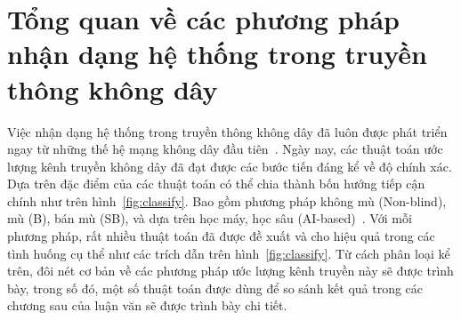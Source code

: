 \clearpage
{}

\setcounter{chapter}{0}
\chapter[TỔNG QUAN VỀ CÁC PHƯƠNG PHÁP NHẬN DẠNG HỆ THỐNG TRONG TRUYỀN THÔNG KHÔNG DÂY]{Tổng quan về các phương pháp nhận dạng hệ thống trong truyền thông không dây}
\label{sec:back}

Việc nhận dạng hệ thống trong truyền thông không dây đã luôn được phát triển ngay từ những thế hệ mạng không dây đầu tiên~\cite{Tse2005}. Ngày nay, các thuật toán ước lượng kênh truyền không dây đã đạt được các bước tiến đáng kể về độ chính xác. Dựa trên đặc điểm của các thuật toán có thể chia thành bốn hướng tiếp cận chính như trên hình~\ref{fig:classify}. Bao gồm phương pháp không mù (Non-blind), mù (B), bán mù (SB), và dựa trên học máy, học sâu (AI-based)~\cite{vilas2022}. 
Với mỗi phương pháp, rất nhiều thuật toán đã được đề xuất và cho hiệu quả trong các tình huống cụ thể như các trích dẫn trên hình~\ref{fig:classify}.
Từ cách phân loại kể trên, 
đôi nét cơ bản về các phương pháp ước lượng kênh truyền này sẽ được trình bày, trong số đó, một số thuật toán được dùng để so sánh kết quả trong các chương sau của luận văn sẽ được trình bày chi tiết.


